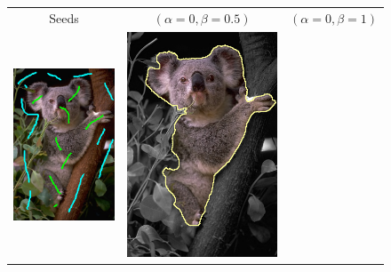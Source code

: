 \documentclass[runningheads]{llncs}
\begin{document}
\begin{figure}
\center
\begin{tabular}{ccc}
Seeds & $(\alpha=0, \beta=0.5)$ & $(\alpha=0,\beta=1)$ \\
 	\includegraphics[scale=0.25]{images/segmentation/bc/coala/seeds.png} & 
	\includegraphics[scale=0.25]{images/segmentation/bc/coala/r3/lg0_sq05_dt1_it50.png} & 

\end{tabular}
\end{figure}
\end{document}

